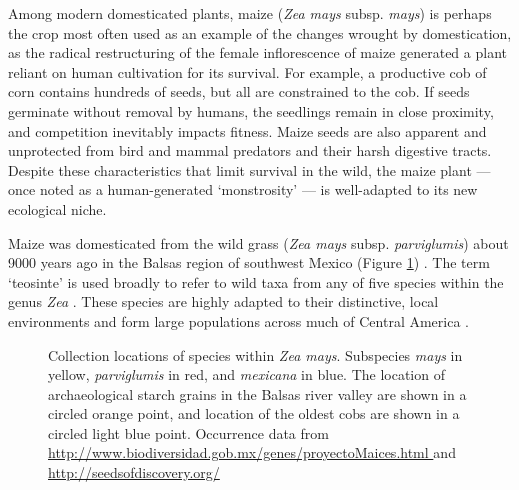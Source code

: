 \documentclass[9pt,twocolumn,twoside]{rilabRxiv}
\begin{document}
Among modern domesticated plants, maize (\textit{Zea mays} subsp. \textit{mays}) is perhaps the crop most often used as an example of the changes wrought by domestication, as the radical restructuring of the female inflorescence of maize generated a plant reliant on human cultivation for its survival.
For example, a productive cob of corn contains hundreds of seeds, but all are constrained to the cob.
If seeds germinate without removal by humans, the seedlings remain in close proximity, and competition inevitably impacts fitness.
Maize seeds are also apparent and unprotected from bird and mammal predators and their harsh digestive tracts.
Despite these characteristics that limit survival in the wild, the maize plant --- once noted as a human-generated `monstrosity' \citep{beadle1972} --- is well-adapted to its new ecological niche.

Maize was domesticated from the wild grass (\textit{Zea mays} subsp. \textit{parviglumis}) about 9000 years ago in the Balsas region of southwest Mexico (Figure \ref{fig:map}) \citep{matsuoka2002, piperno2009}.
The term `teosinte' is used broadly to refer to wild taxa from any of five species within the genus \textit{Zea} \citep{doebley1980, iltis1980}.
These species are highly adapted to their distinctive, local environments \citep{hufford2012maxent, hufford2012review} and form large populations across much of Central America \citep{wilkes1967}.


   \begin{figure}
        \caption{\label{fig:map} Collection locations of species within \textit{Zea mays}. Subspecies \textit{mays} in yellow, \textit{parviglumis} in red, and \textit{mexicana} in blue. The location of archaeological starch grains \citep{piperno2009} in the Balsas river valley are shown in a circled orange point, and location of the oldest cobs \citep{benz2001} are shown in a circled light blue point. Occurrence data from \url{http://www.biodiversidad.gob.mx/genes/proyectoMaices.html
} and \url{http://seedsofdiscovery.org/}}
\end{figure}
\end{document}
